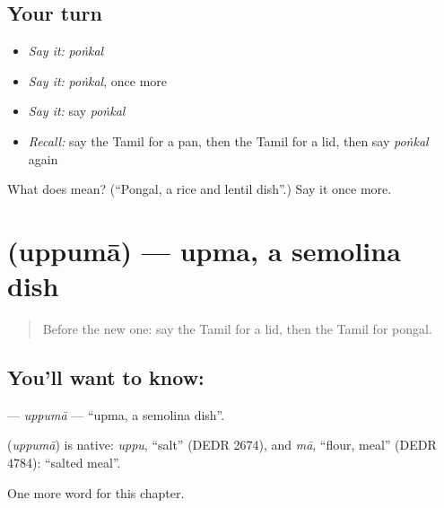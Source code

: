\subsection*{Your turn}
\begin{itemize}
\raggedright
  \item \emph{Say it:} \emph{poṅkal}
  \item \emph{Say it:} \emph{poṅkal}, once more
  \item \emph{Say it:} say \emph{poṅkal}
  \item \emph{Recall:} say the Tamil for a pan, then the Tamil for a lid, then say \emph{poṅkal} again
\end{itemize}

\begin{tcolorbox}[breakable,colback=teal!4,colframe=teal!35!black,title={Before you move on}]
What does  mean? (\textquotedblleft{}Pongal, a rice and lentil dish\textquotedblright{}.) Say it once more.
\end{tcolorbox}
\section[\texorpdfstring{\ta{உப்புமா} (uppumā)}{உப்புமா (uppumā)}]{ (uppumā) — upma, a semolina dish}

\label{lesson:TA-C183-uppuma}



\begin{quote}
Before the new one: say the Tamil for a lid, then the Tamil for pongal.
\end{quote}

\subsection*{You'll want to know: }
\textbf{} — \emph{uppumā} — \textquotedblleft{}upma, a semolina dish\textquotedblright{}.

\begin{cousinweb}
\textbf{} (\emph{uppumā}) is native: \emph{uppu}, \textquotedblleft{}salt\textquotedblright{} (DEDR 2674), and \emph{mā}, \textquotedblleft{}flour, meal\textquotedblright{} (DEDR 4784): \textquotedblleft{}salted meal\textquotedblright{}.
\end{cousinweb}

\begin{grammarlens}[title={What you've built}]
One more word for this chapter.
\end{grammarlens}

